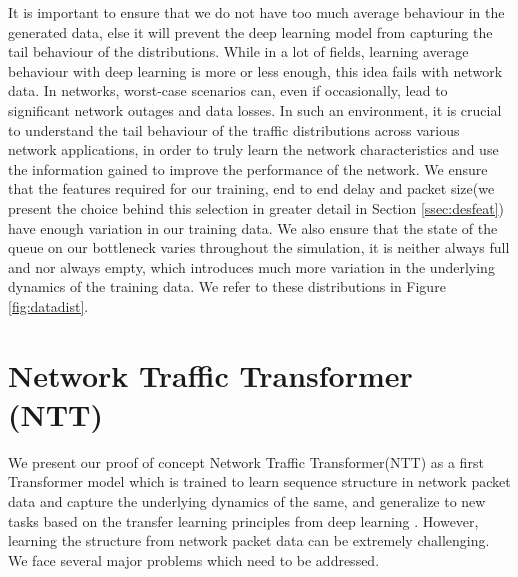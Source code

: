 It is important to ensure that we do not have too much average behaviour in the generated data, else it will prevent the deep learning model from capturing the tail behaviour of the distributions. While in a lot of fields, learning average behaviour with deep learning is more or less enough, this idea fails with network data. In networks, worst-case scenarios can, even if occasionally, lead to significant network outages and data losses. In such an environment, it is crucial to understand the tail behaviour of the traffic distributions across various network applications, in order to truly learn the network characteristics and use the information gained to improve the performance of the network. We ensure that the features required for our training, end to end delay and packet size(we present the choice behind this selection in greater detail in Section \ref{ssec:desfeat}) have enough variation in our training data. We also ensure that the state of the queue on our bottleneck varies throughout the simulation, \ie it is neither always full and nor always empty, which introduces much more variation in the underlying dynamics of the training data. We refer to these distributions in Figure \ref{fig:datadist}.


\section{Network Traffic Transformer (NTT)}
\label{sec:ntt}

We present our proof of concept Network Traffic Transformer(NTT) as a first Transformer model which is trained to learn sequence structure in network packet data and capture the underlying dynamics of the same, and generalize to new tasks based on the transfer learning principles from deep learning . However, learning the structure from network packet data can be extremely challenging. We face several major problems which need to be addressed.

